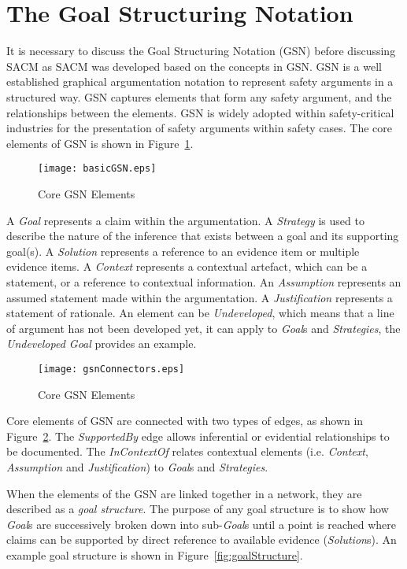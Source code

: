 \section{The Goal Structuring Notation}
\label{gsn}
It is necessary to discuss the Goal Structuring Notation (GSN) before discussing SACM as SACM was developed based on the concepts in GSN. GSN is a well established graphical argumentation notation to represent safety arguments in a structured way. GSN captures elements that form any safety argument, and the relationships between the elements. GSN is widely adopted within safety-critical industries for the presentation of safety arguments within safety cases. The core elements of GSN is shown in Figure~\ref{fig:gsnCore}.

\begin{figure}
	\centering
	\texttt{[image: basicGSN.eps]}
	\caption{Core GSN Elements}
	\label{fig:gsnCore}
\end{figure}

A \textit{Goal} represents a claim within the argumentation. A \textit{Strategy} is used to describe the nature of the inference that exists between a goal and its supporting goal(s). A \textit{Solution} represents a reference to an evidence item or multiple evidence items. A \textit{Context} represents a contextual artefact, which can be a statement, or a reference to contextual information. An \textit{Assumption} represents an assumed statement made within the argumentation. A \textit{Justification} represents a statement of rationale. An element can be \textit{Undeveloped}, which means that a line of argument has not been developed yet, it can apply to \textit{Goal}s and \textit{Strategies}, the \textit{Undeveloped Goal} provides an example. 

\begin{figure}
	\centering
	\texttt{[image: gsnConnectors.eps]}
	\caption{Core GSN Elements}
	\label{fig:gsnEdges}
\end{figure}

Core elements of GSN are connected with two types of edges, as shown in Figure~\ref{fig:gsnEdges}. The \textit{SupportedBy} edge allows inferential or evidential relationships to be documented. The \textit{InContextOf} relates contextual elements (i.e. \textit{Context}, \textit{Assumption} and \textit{Justification}) to \textit{Goal}s and \textit{Strategies}.

When the elements of the GSN are linked together in a network, they are described as a \textit{goal structure}. The purpose of any goal structure is to show how \textit{Goal}s are successively broken down into sub-\textit{Goal}s until a point is reached where claims can be supported by direct reference to available evidence (\textit{Solution}s). An example goal structure is shown in Figure~\ref{fig:goalStructure}.

